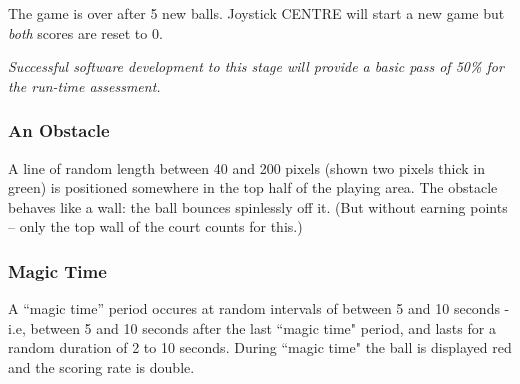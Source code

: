 \documentclass[a4paper]{article}
\begin{document}
The game is over after 5 new balls. Joystick CENTRE will start a new
game but \emph{both} scores are reset to 0.

\medskip

\begin{tcolorbox}
  \emph{Successful software development to this stage will provide a
    basic pass of 50\% for the run-time assessment.}
\end{tcolorbox}
\medskip

\clearpage
\subsubsection{An Obstacle}
A line of random length between 40 and 200 pixels (shown two pixels
thick in green) is positioned somewhere in the top half of the playing
area. The obstacle behaves like a wall: the ball bounces spinlessly
off it. (But without earning points -- only the top wall of the court
counts for this.)

\begin{center}
\end{center}


\subsubsection{Magic Time}
A ``magic time'' period occures at random intervals of between 5 and
10 seconds - i.e, between 5 and 10 seconds after the last ``magic
time" period, and lasts for a random duration of 2 to 10
seconds. During ``magic time" the ball is displayed red and the
scoring rate is double.
\end{document}
